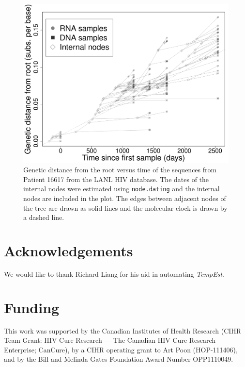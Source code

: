 \documentclass{bioinfo}
\newcommand{\code}[1]{{\tt #1}}
\begin{document}
\begin{figure}[t]
	\centering
	\includegraphics[width=\columnwidth]{Patient_16617_gray}
	\caption[Genetic distance versus time plot]{Genetic distance from the root versus time of the sequences from Patient 16617 from the LANL HIV database. The dates of the internal nodes were estimated using \code{node.dating} and the internal nodes are included in the plot. The edges between adjacent nodes of the tree are drawn as solid lines and the molecular clock is drawn by a dashed line.}
	\label{fig:pat16617}
\end{figure}

\section*{Acknowledgements} \label{sec:ackn}
We would like to thank Richard Liang for his aid in automating \emph{TempEst}.

\section*{Funding} \label{sec:fund}
This work was supported by the Canadian Institutes of Health Research (CIHR Team Grant: HIV Cure Research --- The Canadian HIV Cure Research Enterprise; CanCure), by a CIHR operating grant to Art Poon (HOP-111406), and by the Bill and Melinda Gates Foundation Award Number OPP1110049.



\end{document}
